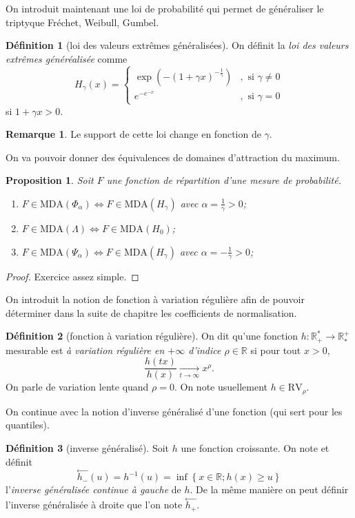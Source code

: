 \documentclass[10p,a4paper,reqno,titlepage]{report}
\newcommand{\R}{\mathbb{R}}
\newcounter{dader}[chapter]
\theoremstyle{plain}
\newtheorem{prop}[prop]{Proposition}
\theoremstyle{definition}
\newtheorem{de}[de]{Définition}
\newtheorem{rem}[dader]{Remarque}
\newcommand{\CNS}{\Longleftrightarrow}
\begin{document}
On introduit maintenant une loi de probabilité qui permet de généraliser le triptyque Fréchet, Weibull, Gumbel.
\begin{de}[loi des valeurs extrêmes généralisées]
	On définit la \textit{loi des valeurs extrêmes généréalisée} comme 
	$$ H_\gamma (x)= \left\{ \begin{array}{ll} \exp(-(1+\gamma x ) ^{-\tfrac{1}{\gamma}}) &, \text{ si } \gamma \neq 0\\
		e^{-e^{-x}} &,\text{ si }\gamma = 0	\end{array}\right.$$
	si $1+  \gamma x > 0.$
	\end{de}
\begin{rem}
	Le support de cette loi change en fonction de $\gamma$.
\end{rem}
On va pouvoir donner des équivalences de domaines d'attraction du maximum.
\begin{prop}
Soit $F$ une fonction de répartition d'une mesure de probabilité. \
\begin{enumerate}
	\item $F\in\mathrm{MDA}(\Phi_\alpha) \CNS F \in \mathrm{MDA}(H_\gamma)$ avec $\alpha = \frac{1}{\gamma} >0$;
	\item $F\in\mathrm{MDA}(\Lambda) \CNS F \in \mathrm{MDA}(H_0)$;
	\item $F\in\mathrm{MDA}(\Psi_\alpha) \CNS F \in \mathrm{MDA}(H_\gamma)$ avec $\alpha = -\frac{1}{\gamma} >0$;
\end{enumerate}
\end{prop}
\begin{proof}
Exercice assez simple.
\end{proof}
On introduit la notion de fonction à variation régulière afin de pouvoir déterminer dans la suite de chapitre les coefficients de normalisation.
\begin{de}[fonction à variation régulière]
	On dit qu'une fonction $h : \R_+ ^* \to \R_* ^+$ mesurable est \textit{à variation régulière en $+\infty$ d'indice $\rho\in\R$} si pour tout $x > 0$, 
	$$ \frac{h(tx)}{h(x)} \underset{t \to \infty}{\longrightarrow} x^\rho.$$
	On parle de variation lente quand $\rho = 0$.
	On note usuellement $h \in \mathrm{RV}_\rho.$
\end{de}
On continue avec la notion d'inverse généralisé d'une fonction (qui sert pour les quantiles).
\begin{de}[inverse généralisé]
	Soit $h$ une fonction croissante. On note et définit
	$$ \overset{\leftarrow}{h_- }(u) = h^{-1} (u)= \inf\left\{ x \in \R; h (x) \geq u\right\}$$
	l'\textit{inverse généralisée continue à gauche} de $h$.
	De la même manière on peut définir l'inverse généralisée à droite que l'on note $\overset{\leftarrow}{h_+ }$.
\end{de}
\end{document}
